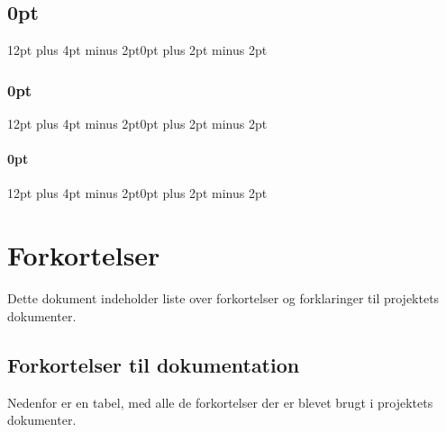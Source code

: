 
\usepackage[explicit]{titlesec}
\usepackage{longtable,tabu}
\usepackage{longtable}
\usepackage{todonotes}




\titlespacing\section{0pt}{12pt plus 4pt minus 2pt}{0pt plus 2pt minus 2pt}
\titlespacing\subsection{0pt}{12pt plus 4pt minus 2pt}{0pt plus 2pt minus 2pt}
\titlespacing\subsubsection{0pt}{12pt plus 4pt minus 2pt}{0pt plus 2pt minus 2pt}
\raggedbottom




\tableofcontents

\chapter{Forkortelser}
Dette dokument indeholder liste over forkortelser og forklaringer til projektets dokumenter. 

\section{Forkortelser til dokumentation}
Nedenfor er en tabel, med alle de forkortelser der er blevet brugt i projektets dokumenter. 

